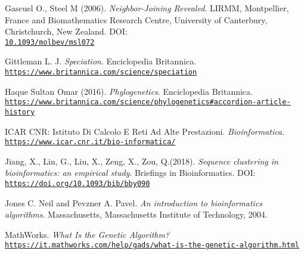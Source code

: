 \documentclass[twoside,openright,titlepage,fleqn,
,	headinclude,12pt,a4paper,BCOR5mm,footinclude,table]{scrbook}
\newcommand{\?}{'\-\nobreak\hspace{0pt}}
\begin{document}
\begin{thebibliography}{60}
Gascuel O., Steel M (2006). \newline
\textit{Neighbor-Joining Revealed}. \newline
LIRMM, Montpellier, France and Biomathematics Research Centre, University of Canterbury, Christchurch, New Zealand. \newline
DOI: \\\texttt{\url{10.1093/molbev/msl072}}

Gittleman L. J. \newline
\textit{Speciation}.\newline
Enciclopedia Britannica.
\\\texttt{\url{https://www.britannica.com/science/speciation}}

Haque Sultan Omar (2016).\newline
\textit{Phylogenetics}.\newline
Enciclopedia Britannica.
\\\texttt{\url{https://www.britannica.com/science/phylogenetics\#accordion-article-history}}

ICAR CNR: Istituto Di Calcolo E Reti Ad Alte Prestazioni.\newline
\textit{Bioinformatica}.
\\\texttt{\url{https://www.icar.cnr.it/bio-informatica/}}

Jiang, X., Lin, G., Liu, X., Zeng, X., Zou, Q.(2018).\newline
\textit{Sequence clustering in bioinformatics: an empirical study}.\newline
Briefings in Bioinformatics.\newline
DOI: \\\texttt{\url{https://doi.org/10.1093/bib/bby090}}

Jones C. Neil and Pevzner A. Pavel.\newline
\textit{An introduction to bioinformatics algorithms}.\newline
Massachusetts, Massachusetts Institute of Technology, 2004.

MathWorks.\newline
\textit{What Is the Genetic Algorithm?}
\\\texttt{\url{https://it.mathworks.com/help/gads/what-is-the-genetic-algorithm.html}}


\end{thebibliography}
\end{document}
